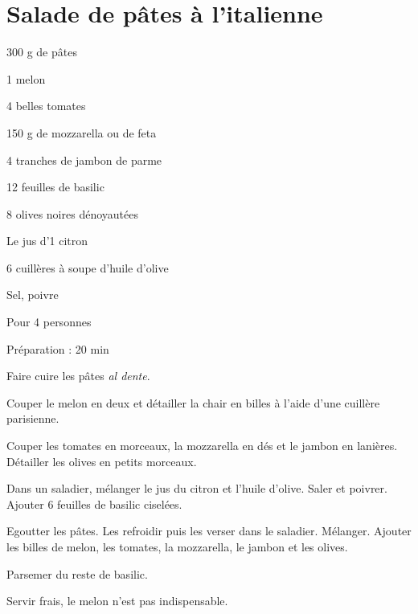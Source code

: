 \section{Salade de pâtes à l'italienne}		%

\begin{ingredients}
\item 300 g de p\^ates
\item 1 melon
\item 4 belles tomates
\item 150 g de mozzarella ou de feta
\item 4 tranches de jambon de parme
\item 12 feuilles de basilic
\item 8 olives noires d\'enoyaut\'ees
\item Le jus d'1 citron
\item 6 cuill\`eres \`a soupe d'huile d'olive
\item Sel, poivre
\end{ingredients}
\begin{infos}
\item Pour 4 personnes
\item Préparation : 20 min
\end{infos}
\begin{etapes}
\item Faire cuire les p\^ates \textit{al dente}.
\item Couper le melon en deux et d\'etailler la chair en billes \`a l'aide d'une cuill\`ere parisienne.
\item Couper les tomates en morceaux, la mozzarella en d\'es et le jambon en lani\`eres. D\'etailler les olives en petits morceaux.
\item Dans un saladier, m\'elanger le jus du citron et l'huile d'olive. Saler et poivrer. Ajouter 6 feuilles de basilic cisel\'ees.
\item Egoutter les p\^ates. Les refroidir puis les verser dans le saladier. M\'elanger. Ajouter les billes de melon, les tomates, la mozzarella, le jambon et les olives.
\item Parsemer du reste de basilic.
\end{etapes}
\begin{conseils}
Servir frais, le melon n'est pas indispensable.
\end{conseils}

